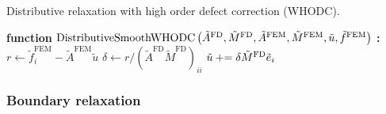 \begin{algorithm}[htbp]
\caption{Distributive relaxation with high order defect correction (WHODC).}
\label{alg:ch5.distributive.defectcorrection}
\begin{algorithmic}[1]
\STATE \textbf{function} $\operatorname{DistributiveSmoothWHODC} \left( \tilde{A}^{\text{FD}}, \tilde{M}^{\text{FD}}, \tilde{A}^{\text{FEM}}, \tilde{M}^{\text{FEM}}, \tilde{u}, \tilde{f}^{\text{FEM}} \right)$ \textbf{:}
        \STATE $r \leftarrow \tilde{f}^{\text{FEM}}_i - \tilde{A}^{\text{FEM}} \tilde{u}$
        \STATE $\delta \leftarrow r / (\tilde{A}^{\text{FD}} \tilde{M}^{\text{FD}})_{ii}$
        \STATE $\tilde{u} +{}\!\!\!= \delta \tilde{M}^{\text{FD}} \tilde{e}_i$
    \ENDFOR
\ENDFOR
\end{algorithmic}
\end{algorithm}

\subsubsection{Boundary relaxation}

